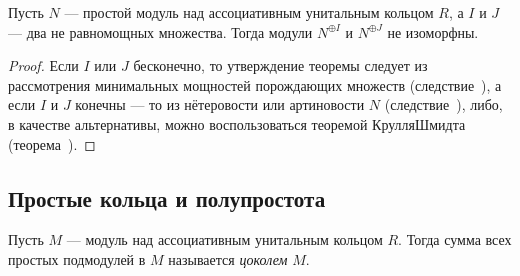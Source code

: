 \documentclass[
	extrafontsizes,
	11pt,
	hyphens,
]{memoir}
\begin{document}
\begin{theorem}
Пусть \(N\) --- простой модуль над ассоциативным унитальным кольцом \(R\), а \(I\) и \(J\) --- два не равномощных множества. Тогда модули \(N^{\oplus I}\) и \(N^{\oplus J}\) не изоморфны.
\end{theorem}

\begin{proof}%
Если \(I\) или \(J\) бесконечно, то утверждение теоремы следует из рассмотрения минимальных мощностей порождающих множеств (следствие~),
а если \(I\) и \(J\) конечны --- то из нётеровости или артиновости \(N\) (следствие~), либо, в качестве альтернативы, можно воспользоваться теоремой Крулля\namedash{}Шмидта (теорема~).
\end{proof}

\subsection{Простые кольца и полупростота}

\begin{definition}
Пусть \(M\) --- модуль над ассоциативным унитальным кольцом \(R\). Тогда сумма всех простых подмодулей в \(M\) называется \emph{цоколем} \(M\).
\end{definition}
\end{document}
